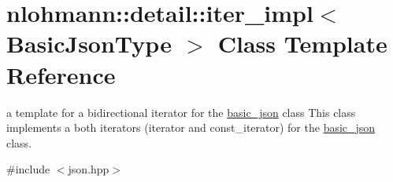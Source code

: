 \hypertarget{classnlohmann_1_1detail_1_1iter__impl}{}\section{nlohmann\+:\+:detail\+:\+:iter\+\_\+impl$<$ Basic\+Json\+Type $>$ Class Template Reference}
\label{classnlohmann_1_1detail_1_1iter__impl}


a template for a bidirectional iterator for the \hyperlink{classnlohmann_1_1basic__json}{basic\+\_\+json} class This class implements a both iterators (iterator and const\+\_\+iterator) for the \hyperlink{classnlohmann_1_1basic__json}{basic\+\_\+json} class.  




{\ttfamily \#include $<$json.\+hpp$>$}

